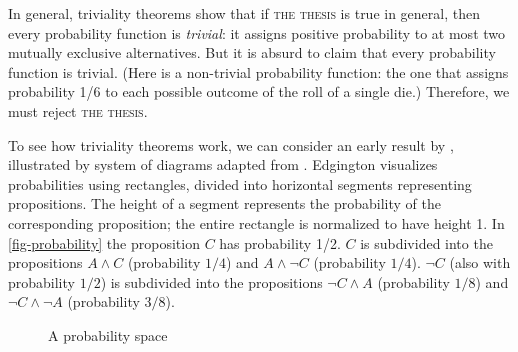 In general, triviality theorems show that if  \textsc{the thesis} is true in general, then every probability function is \emph{trivial}: it assigns positive probability to at most two mutually exclusive alternatives.  But it is absurd to claim that every probability function is trivial.  (Here is a non-trivial probability function: the one that assigns probability 1/6 to each possible outcome of the roll of a single die.) Therefore, we must reject \textsc{the thesis}.

To see how triviality theorems work, we can consider an early result by \citet{lewis-conditional-i}, illustrated by system of diagrams adapted from \citet{edgington-conditionals}.  Edgington visualizes probabilities using rectangles, divided into horizontal segments representing propositions.  The height of a segment represents the probability of the corresponding proposition; the entire rectangle is normalized to have height 1.  In \autoref{fig-probability} the proposition $C$ has probability 1/2.  $C$ is subdivided into the propositions $A \wedge C$ (probability $1/4$) and  $A \wedge \neg C$ (probability $1/4$). $\neg C$ (also with probability $1/2$) is subdivided into the propositions $\neg C \wedge A$ (probability $1/8$) and $\neg C \wedge \neg A$ (probability $3/8$).

\begin{figure}
\centering
{}
\caption{A probability space}
\label{fig-probability}
\end{figure}

